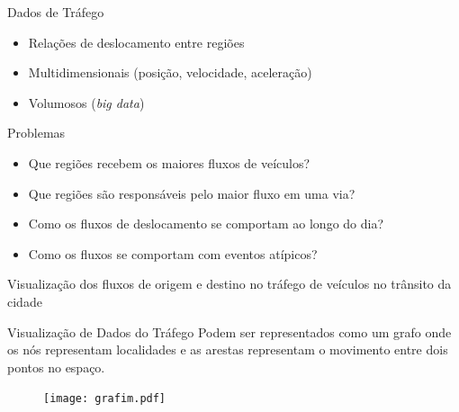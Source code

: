 
\begin{frame}{Dados de Tráfego}
  \begin{itemize}
    \item Relações de deslocamento entre regiões
    \item Multidimensionais (posição, velocidade, aceleração)
    \item Volumosos (\emph{big data})
  \end{itemize}
\end{frame}


\begin{frame}{Problemas}
  \begin{itemize}
    \item Que regiões recebem os maiores fluxos de veículos?
    \item Que regiões são responsáveis pelo maior fluxo em uma via?
    \item Como os fluxos de deslocamento se comportam ao longo do dia?
    \item Como os fluxos se comportam com eventos atípicos?
  \end{itemize}
\end{frame}


\begin{frame}[standout]
  Visualização dos fluxos de origem e destino no tráfego de veículos no
trânsito da cidade
\end{frame}


{
\begin{frame}{Visualização de Dados do Tráfego}
  Podem ser representados como um grafo onde os nós representam localidades e
as arestas representam o movimento entre dois pontos no espaço.

  \begin{figure}[!htb]
    \centering
    \texttt{[image: grafim.pdf]}
  \end{figure}
\end{frame}
}

